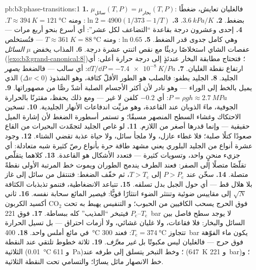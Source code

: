 \begin{solution}{pb:b3:phase-transitions:1}
\textbf{1.} $\mu_{\text{سائل}}(T, P) = \mu_{\text{بخار}}(T,
P)$: فالغليان تعايش، ضغطًا بضغط.
\textbf{2.} $\qty{3.6}{kPa/K}$.
\textbf{3.} $\ln2 = 4900(1/373 - 1/T)$: ومنه $T \approx \qty{394}{K} =
\qty{121}{\celsius}$.
\textbf{4.} إحدى وعشرون درجة بقاعدة ``التضاعف لكل عشر'': أي أسرع
بنحو أربع مرات --- وهي كامل جدوى قدر الضغط.
\textbf{5.} $\ln0.65$: ومنه $T \approx \qty{361}{K} =
\qty{88}{\celsius}$ --- فتُستخلص عفصات الشاي استخلاصًا رديئًا مع نقص اثنتي عشرة
درجة.
\textbf{6.} المذاب يخفض $\mu$ \emph{السائل}
(\cref{exo:b3:grand-canonical:8})؛ فتحتاج مطابقة البخار عندئذٍ إلى
درجة حرارة أعلى: أي ارتفاع نقطة الغليان.
\textbf{7.} $\dd T/\dd P = \qty{-7.4e-8}{K/Pa}$: أي سالب ---
فالضغط \emph{يصهر} الجليد.
\textbf{8.} الجليد يطفو: فالصلب هو الطور الأقلّ كثافة، وهو
الشذوذ ($\Delta v < 0$) الذي يميل بالخط إلى الوراء --- وهو نادر
لأن أكثر الأجسام الصلبة أشدّ رصًّا من مصهوراتها.
\textbf{9.} $P = \rho gh \approx \qty{2.7}{MPa}$: أي
$-0.2$ كلفن لا غير --- ومع ذلك يحفظ، مقترنًا بالحرارة الجوفية، ماءَ
الذوبان عند القاعدة، وهو مزيِّت اندفاعات الأنهار الجليدية.
\textbf{10.} تسخين الاحتكاك وغشاء السطح المنصهر مسبقًا؛ و
تستمر أسطورة الضغط لأن إشارة الميل حقيقية
--- وإنما قدرها أصغر من اللازم.
\textbf{11.} لو غاص الجليد لتجمّدت البحيرات من القاع صعودًا
كتلًا صلبة؛ فلا غطاء عازل، ولا ملجأ سائل، ولا حياة
عذبة تقضي الشتاء.
\textbf{12.} وجود عشرة أنواع من الجليد البلوري يعني مشهد طاقة
حرة بأنواع رصّ كثيرة شبه متعادلة: أي جزيء منحنٍ واحد،
وتسويات كثيرة --- فتعدد الأشكال هو القاعدة.
\textbf{13.} كلاهما يتقلّص تقلّصًا متصلًا إلى الصفر: فعند الطرف
يندمج الطوران ويموت خط المرتبة الأولى نقطةً
متصلة.
\textbf{14.} سخّن عند $P > P_{\text{c}}$ إلى $T > T_{\text{c}}$،
ثم خفّف الضغط: فتنتقل من سائل إلى غاز بلا هلال قط --- أي
حول الجبل بدل تسلقه.
\textbf{15.} تتباعد الانضغاطية، فتنمو تذبذبات الكثافة $\sqrt N$
إلى مقاييس ضوئية وتنتثر الضوء انتثارًا قويًّا:
فيصير المائع سحابة نفسه.
\textbf{16.} ثاني أكسيد الكربون CO$_2$ فوق الحرج يسحب الكافيين من الحبوب؛ و
التنفيس يهبط به تحت $T_{\text{c}}$--$P_{\text{c}}$ فيتبخر
``المذيب'' كله ببساطة.
\textbf{17.} فوق \qty{221}{bar} لا يوجد سطح فاصل بين السائل والبخار:
فلا فقاعات، ولا غليان غشائي، ولا أزمات احتراق ---
بل تسيل الحرارة في مائع أملس واحد.
\textbf{18.} \qty{400}{\celsius} تتجاوز $T_{\text{c}} =
\qty{374}{\celsius}$: فعند \qty{300}{bar} يكون ماء الفوّهة
فوق حرج --- فالغليان ليس مكبوتًا بل
\emph{غير معرَّف}.
\textbf{19.} ثلاثة خطوط تلتقي عند النقطة الثلاثية
(\qty{0.01}{\celsius} و \qty{611}{Pa})؛ وخط التبخر
يتسلق إلى طرفه عند (\qty{647}{K} و \qty{221}{bar})؛ و
خط الانصهار مائل يسارًا؛ والتسامي تحت النقطة الثلاثية.

\end{solution}
